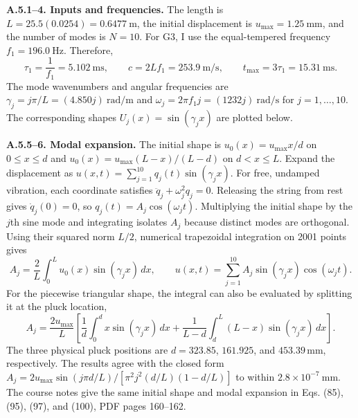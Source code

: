 \textbf{A.5.1--4. Inputs and frequencies.} The length is $L=25.5(0.0254)=0.6477\ \mathrm{m}$, the initial displacement is $u_{\max}=1.25\ \mathrm{mm}$, and the number of modes is $N=10$. For G3, I use the equal-tempered frequency $f_1=196.0\ \mathrm{Hz}$. Therefore,
\[
\tau_1=\frac1{f_1}=5.102\ \mathrm{ms},\qquad
c=2Lf_1=253.9\ \mathrm{m/s},\qquad
t_{\max}=3\tau_1=15.31\ \mathrm{ms}.
\]
The mode wavenumbers and angular frequencies are $\gamma_j=j\pi/L=(4.850j)\ \mathrm{rad/m}$ and $\omega_j=2\pi f_1j=(1232j)\ \mathrm{rad/s}$ for $j=1,\ldots,10$. The corresponding shapes $U_j(x)=\sin(\gamma_jx)$ are plotted below.

\textbf{A.5.5--6. Modal expansion.} The initial shape is $u_0(x)=u_{\max}x/d$ on $0\le x\le d$ and $u_0(x)=u_{\max}(L-x)/(L-d)$ on $d<x\le L$. Expand the displacement as $u(x,t)=\sum_{j=1}^{10}q_j(t)\sin(\gamma_jx)$. For free, undamped vibration, each coordinate satisfies $\ddot q_j+\omega_j^2q_j=0$. Releasing the string from rest gives $\dot q_j(0)=0$, so $q_j(t)=A_j\cos(\omega_jt)$. Multiplying the initial shape by the $j$th sine mode and integrating isolates $A_j$ because distinct modes are orthogonal. Using their squared norm $L/2$, numerical trapezoidal integration on 2001 points gives
\[
A_j=\frac{2}{L}\int_0^L u_0(x)\sin(\gamma_jx)\,dx,\qquad
u(x,t)=\sum_{j=1}^{10}A_j\sin(\gamma_jx)\cos(\omega_jt).
\]
For the piecewise triangular shape, the integral can also be evaluated by splitting it at the pluck location,
\[
A_j=\frac{2u_{\max}}{L}\left[
\frac{1}{d}\int_0^d x\sin(\gamma_jx)\,dx+
\frac{1}{L-d}\int_d^L(L-x)\sin(\gamma_jx)\,dx\right].
\]
The three physical pluck positions are $d=323.85$, $161.925$, and $453.39\,\mathrm{mm}$, respectively. The results agree with the closed form $A_j=2u_{\max}\sin(j\pi d/L)/[\pi^2j^2(d/L)(1-d/L)]$ to within $2.8\times10^{-7}\ \mathrm{mm}$. The course notes give the same initial shape and modal expansion in Eqs. (85), (95), (97), and (100), PDF pages 160--162.

